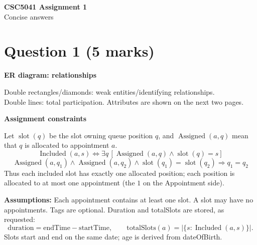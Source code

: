\documentclass[11pt,a4paper]{article}
\newcommand{\total}[2]{\draw[double,double distance=1.2pt] (#1)--(#2);}
\begin{document}
\begin{center}{\Large\bfseries CSC5041 Assignment 1}\\[3pt]
Concise answers\end{center}
\section*{Question 1 (5 marks)}
\textbf{ER diagram: relationships}
\begin{center}
\end{center}
Double rectangles/diamonds: weak entities/identifying relationships.\\
Double lines: total participation. Attributes are shown on the next two pages.

\textbf{Assignment constraints}

Let $\operatorname{slot}(q)$ be the slot owning queue position $q$, and
$\operatorname{Assigned}(a,q)$ mean that $q$ is allocated to appointment $a$.
\[
\boxed{\operatorname{Included}(a,s)\iff
 \exists q\,[\operatorname{Assigned}(a,q)\land\operatorname{slot}(q)=s]}
\]
\[
\boxed{\operatorname{Assigned}(a,q_1)\land\operatorname{Assigned}(a,q_2)
 \land\operatorname{slot}(q_1)=\operatorname{slot}(q_2)\Rightarrow q_1=q_2}
\]
Thus each included slot has exactly one allocated position; each position is
allocated to at most one appointment (the $1$ on the Appointment side).

\textbf{Assumptions:} Each appointment contains at least one slot. A slot may have
no appointments. Tags are optional. Duration and totalSlots are stored, as requested:
\[
\mathrm{duration}=\mathrm{endTime}-\mathrm{startTime},\qquad
\mathrm{totalSlots}(a)=|\{s:\operatorname{Included}(a,s)\}|.
\]
Slots start and end on the same date; age is derived from dateOfBirth.
\end{document}

